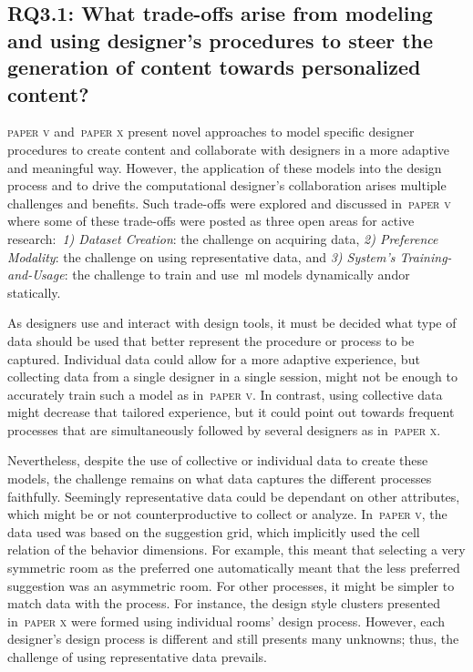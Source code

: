 \subsection[Research Question 3.1]{RQ3.1: What trade-offs arise from modeling and using designer's procedures to steer the generation of content towards personalized content?}

\textsc{paper v} and~\textsc{paper x} present novel approaches to model specific designer procedures to create content and collaborate with designers in a more adaptive and meaningful way. However, the application of these models into the design process and to drive the computational designer's collaboration arises multiple challenges and benefits. Such trade-offs were explored and discussed in~\textsc{paper v} where some of these trade-offs were posted as three open areas for active research:~\textit{1) Dataset Creation}: the challenge on acquiring data, \textit{2) Preference Modality}: the challenge on using representative data, and \textit{3) System's Training-and-Usage}: the challenge to train and use~\acrshort{ml} models dynamically and\/or statically.  

As designers use and interact with design tools, it must be decided what type of data should be used that better represent the procedure or process to be captured. Individual data could allow for a more adaptive experience, but collecting data from a single designer in a single session, might not be enough to accurately train such a model as in~\textsc{paper v}. In contrast, using collective data might decrease that tailored experience, but it could point out towards frequent processes that are simultaneously followed by several designers as in~\textsc{paper x}.

Nevertheless, despite the use of collective or individual data to create these models, the challenge remains on what data captures the different processes faithfully. Seemingly representative data could be dependant on other attributes, which might be or not counterproductive to collect or analyze. In~\textsc{paper v}, the data used was based on the suggestion grid, which implicitly used the cell relation of the behavior dimensions. For example, this meant that selecting a very symmetric room as the preferred one automatically meant that the less preferred suggestion was an asymmetric room. For other processes, it might be simpler to match data with the process. For instance, the design style clusters presented in~\textsc{paper x} were formed using individual rooms' design process. However, each designer's design process is different and still presents many unknowns; thus, the challenge of using representative data prevails.

